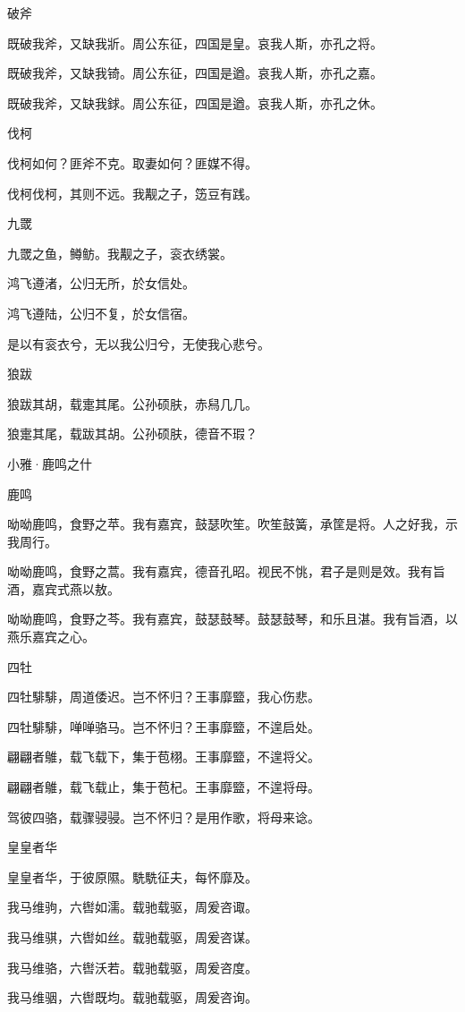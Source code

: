 破斧

既破我斧，又缺我斨。周公东征，四国是皇。哀我人斯，亦孔之将。

既破我斧，又缺我锜。周公东征，四国是遒。哀我人斯，亦孔之嘉。

既破我斧，又缺我銶。周公东征，四国是遒。哀我人斯，亦孔之休。

伐柯

伐柯如何？匪斧不克。取妻如何？匪媒不得。

伐柯伐柯，其则不远。我觏之子，笾豆有践。

九罭

九罭之鱼，鳟鲂。我觏之子，衮衣绣裳。

鸿飞遵渚，公归无所，於女信处。

鸿飞遵陆，公归不复，於女信宿。

是以有衮衣兮，无以我公归兮，无使我心悲兮。

狼跋

狼跋其胡，载疐其尾。公孙硕肤，赤舄几几。

狼疐其尾，载跋其胡。公孙硕肤，德音不瑕？




小雅·鹿鸣之什


鹿鸣

呦呦鹿鸣，食野之苹。我有嘉宾，鼓瑟吹笙。吹笙鼓簧，承筐是将。人之好我，示我周行。

呦呦鹿鸣，食野之蒿。我有嘉宾，德音孔昭。视民不恌，君子是则是效。我有旨酒，嘉宾式燕以敖。

呦呦鹿鸣，食野之芩。我有嘉宾，鼓瑟鼓琴。鼓瑟鼓琴，和乐且湛。我有旨酒，以燕乐嘉宾之心。

四牡

四牡騑騑，周道倭迟。岂不怀归？王事靡盬，我心伤悲。

四牡騑騑，啴啴骆马。岂不怀归？王事靡盬，不遑启处。

翩翩者鵻，载飞载下，集于苞栩。王事靡盬，不遑将父。

翩翩者鵻，载飞载止，集于苞杞。王事靡盬，不遑将母。

驾彼四骆，载骤骎骎。岂不怀归？是用作歌，将母来谂。

皇皇者华

皇皇者华，于彼原隰。駪駪征夫，每怀靡及。

我马维驹，六辔如濡。载驰载驱，周爰咨诹。

我马维骐，六辔如丝。载驰载驱，周爰咨谋。

我马维骆，六辔沃若。载驰载驱，周爰咨度。

我马维骃，六辔既均。载驰载驱，周爰咨询。

